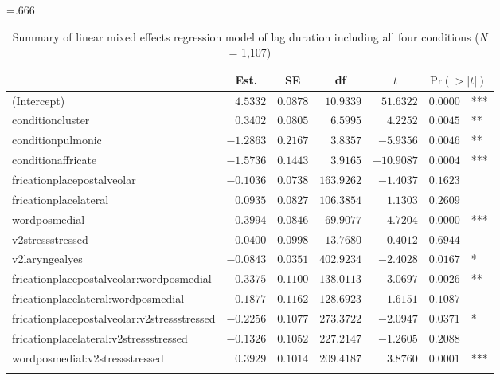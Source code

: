 \documentclass[output=paper,colorlinks,citecolor=brown]{langscibook}
\begin{document}
	\begin{table}
		\caption{Summary of linear mixed effects regression model of lag duration including all four conditions (\textit{N} = 1,107)}
		\label{Table:4condition-lag}
		\footnotesize\tabcolsep=.666\tabcolsep
		\begin{tabular}{lrrrrr@{\,}l}
			\lsptoprule
			\multicolumn{1}{l}{coef} & 
			\multicolumn{1}{c}{Est.} &
			\multicolumn{1}{c}{SE} & 
			\multicolumn{1}{c}{df} & 
			\multicolumn{1}{c}{$t$} & 
			\multicolumn{2}{c}{$\text{Pr}(>|t|)$}\\
			\midrule
    			(Intercept)&$ 4.5332$&$0.0878$&$ 10.9339$&$ 51.6322$&$0.0000$&***\\
    			conditioncluster&$ 0.3402$&$0.0805$&$  6.5995$&$  4.2252$&$0.0045$&**\\
    			conditionpulmonic&$-1.2863$&$0.2167$&$  3.8357$&$ -5.9356$&$0.0046$&**\\
    			conditionaffricate&$-1.5736$&$0.1443$&$  3.9165$&$-10.9087$&$0.0004$&***\\
    			fricationplacepostalveolar&$-0.1036$&$0.0738$&$163.9262$&$ -1.4037$&$0.1623$&\\
    			fricationplacelateral&$ 0.0935$&$0.0827$&$106.3854$&$  1.1303$&$0.2609$&\\
    			wordposmedial&$-0.3994$&$0.0846$&$ 69.9077$&$ -4.7204$&$0.0000$&***\\
    			v2stressstressed&$-0.0400$&$0.0998$&$ 13.7680$&$ -0.4012$&$0.6944$&\\
    			v2laryngealyes&$-0.0843$&$0.0351$&$402.9234$&$ -2.4028$&$0.0167$&*\\
    			fricationplacepostalveolar:wordposmedial&$ 0.3375$&$0.1100$&$138.0113$&$  3.0697$&$0.0026$&**\\
    			fricationplacelateral:wordposmedial&$ 0.1877$&$0.1162$&$128.6923$&$  1.6151$&$0.1087$&\\
    			fricationplacepostalveolar:v2stressstressed&$-0.2256$&$0.1077$&$273.3722$&$ -2.0947$&$0.0371$&*\\
    			fricationplacelateral:v2stressstressed&$-0.1326$&$0.1052$&$227.2147$&$ -1.2605$&$0.2088$&\\
    			wordposmedial:v2stressstressed&$ 0.3929$&$0.1014$&$209.4187$&$  3.8760$&$0.0001$&***\\
    			\lspbottomrule
    		\end{tabular}
    	\end{table}
\end{document}
